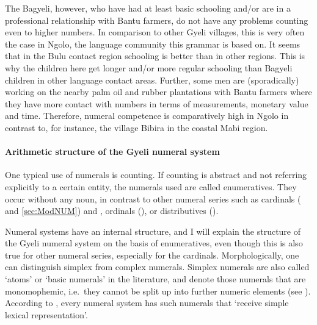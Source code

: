 The Bagyeli, however, who have had at least basic schooling and/or are in a professional relationship with Bantu farmers, do not have any problems counting even to higher numbers. In comparison to other Gyeli villages, this is very often the case in Ngolo, the language community this grammar is based on. It seems that in the Bulu contact region schooling is better than in other regions. This is why the children here get longer and/or more regular schooling than Bagyeli children in other language contact areas. Further, some men are (sporadically) working on the nearby palm oil and rubber plantations with Bantu farmers where they have more contact with numbers in terms of measurements, monetary value and time. Therefore, numeral competence is comparatively high in Ngolo in contrast to, for instance,  the village Bibira in the coastal Mabi region.


\paragraph{Arithmetic structure of the Gyeli numeral system} One typical use of numerals is counting. If counting is abstract and not referring explicitly to a certain entity, the numerals used are called enumeratives. They occur without any noun, in contrast to other numeral series such as cardinals ( and \ref{sec:ModNUM}) and , ordinals (), or distributives ().

Numeral systems have an internal structure, and I will explain the structure of the Gyeli numeral system on the basis of enumeratives, even though this is also true for other numeral series, especially for the cardinals. Morphologically,  one can distinguish simplex from complex numerals. Simplex numerals are also called `atoms' or `basic numerals' in the literature, and  denote those numerals that are monomophemic, i.e.~they cannot be split up into further numeric elements (see \citet[25]{borchardt11}). According to \citet[255]{greenberg78}, every numeral system has such numerals that `receive simple lexical representation'.

